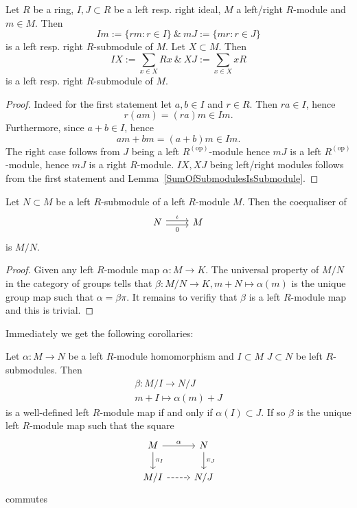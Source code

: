 \begin{lemma}
    Let $R$ be a ring, $I,J\subset R$ be a left resp. right ideal, $M$ a left/right $R$-module and $m\in M$. Then 
    $$Im := \{rm : r\in I\} \ \& \ mJ := \{mr : r \in J\}$$
    is a left resp. right $R$-submodule of $M$. Let $X\subset M$. Then 
    $$IX := \sum_{x\in X} Rx \ \& \ XJ := \sum_{x\in X} xR$$
    is a left resp. right $R$-submodule of $M$.
\end{lemma}
\begin{proof}
    Indeed for the first statement let $a,b\in I$ and $r\in R$. Then $ra\in I$, hence 
    $$r(am)=(ra)m\in Im.$$
    Furthermore, since $a+b\in I$, hence
    $$am+bm=(a+b)m\in Im.$$
    The right case follows from $J$ being a left $R^{(\mathrm{op})}$-module hence $mJ$ is a left $R^{(\mathrm{op})}$-module, hence $mJ$ is a right $R$-module.
    $IX, XJ$ being left/right modules follows from the first statement and Lemma~\ref{SumOfSubmodulesIsSubmodule}.
\end{proof}
\begin{theorem}
    Let $N\subset M$ be a left $R$-submodule of a left $R$-module $M$. Then the coequaliser of 
    $$
        \begin{tikzcd}
            N \arrow[r,"\iota", shift left=0.5ex] \arrow[r,"0",shift right=0.5ex, swap] & M
        \end{tikzcd}
    $$
    is $M/N$.
\end{theorem}
\begin{proof}
    Given any left $R$-module map $\alpha : M \rightarrow K$. The universal property of $M/N$ in the category of groups tells that $\beta : M/N \rightarrow K, m+N \mapsto \alpha(m)$ is the unique group map such that $\alpha = \beta \pi$. It remains to verifiy that $\beta$ is a left $R$-module map and this is trivial. 
\end{proof}
Immediately we get the following corollaries: 
\begin{corollary}\label{WellDefinednessOfQuotientModuleMaps}
    Let $\alpha : M \rightarrow N$ be a left $R$-module homomorphism and $I\subset M$ $J\subset N$ be left $R$-submodules. Then 
    \begin{gather*}
        \beta : M/I \rightarrow N/J\\
        m+I \mapsto \alpha(m)+J    
    \end{gather*}
     is a well-defined left $R$-module map if and only if $\alpha(I)\subset J$. If so $\beta$ is the unique left $R$-module map such that the square
     $$
        \begin{tikzcd}
            M\arrow[r,"\alpha"]\arrow[d, "\pi_I"] & N\arrow[d,"\pi_J"]\\
            M/I \arrow[r, dashrightarrow] & N/J
        \end{tikzcd}
     $$
     commutes
\end{corollary}
